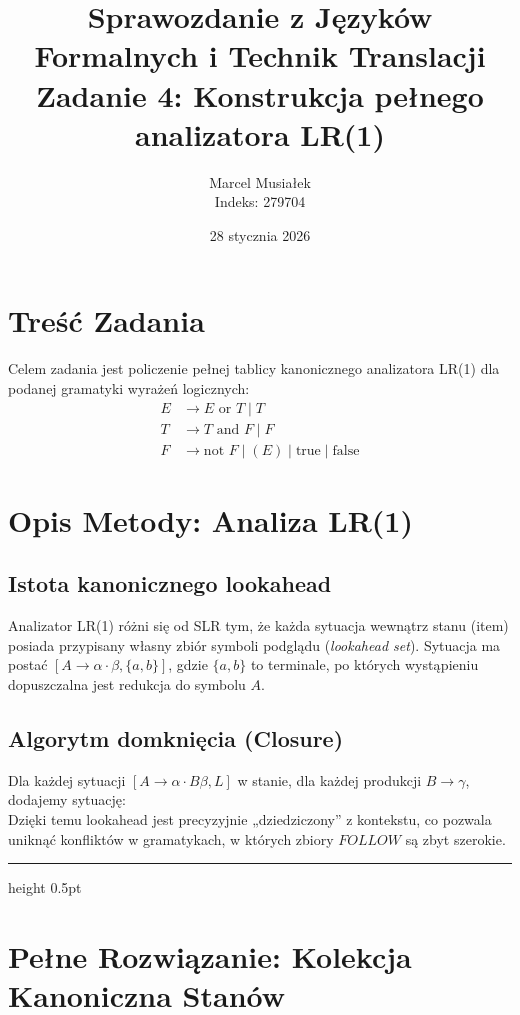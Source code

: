 \documentclass[11pt, a4paper]{article}
\title{\textbf{Sprawozdanie z Języków Formalnych i Technik Translacji} \\ Zadanie 4: Konstrukcja pełnego analizatora LR(1)}
\author{Marcel Musiałek \\ Indeks: 279704}
\date{28 stycznia 2026}
\newcommand{\taskseparator}{\vspace{0.5cm}\leavevmode\leaders\hrule height 0.5pt\hfill\kern0pt\vspace{0.5cm}}
\begin{document}
\maketitle
\tableofcontents
\newpage

\section{Treść Zadania}
Celem zadania jest policzenie pełnej tablicy kanonicznego analizatora LR(1) dla podanej gramatyki wyrażeń logicznych:
\begin{align*}
    E &\to E \text{ or } T \mid T \\
    T &\to T \text{ and } F \mid F \\
    F &\to \text{not } F \mid (E) \mid \text{true} \mid \text{false}
\end{align*}

\section{Opis Metody: Analiza LR(1)}

\subsection{Istota kanonicznego lookahead}
Analizator LR(1) różni się od SLR tym, że każda sytuacja wewnątrz stanu (item) posiada przypisany własny zbiór symboli podglądu (\textit{lookahead set}). Sytuacja ma postać $[A \to \alpha \cdot \beta, \{a, b\}]$, gdzie $\{a, b\}$ to terminale, po których wystąpieniu dopuszczalna jest redukcja do symbolu $A$.

\subsection{Algorytm domknięcia (Closure)}
Dla każdej sytuacji $[A \to \alpha \cdot B \beta, L]$ w stanie, dla każdej produkcji $B \to \gamma$, dodajemy sytuację:
\begin{equation}
    [B \to \cdot \gamma, FIRST(\beta L)]
\end{equation}
Dzięki temu lookahead jest precyzyjnie „dziedziczony” z kontekstu, co pozwala uniknąć konfliktów w gramatykach, w których zbiory $FOLLOW$ są zbyt szerokie.

\taskseparator

\section{Pełne Rozwiązanie: Kolekcja Kanoniczna Stanów}
\end{document}
